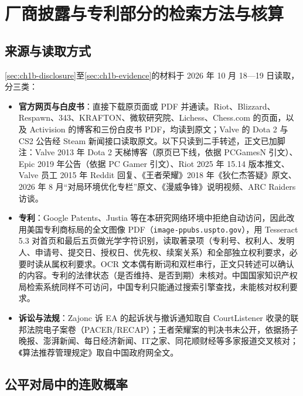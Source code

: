 \section{厂商披露与专利部分的检索方法与核算}
\label{app:ch1b}

\subsection{来源与读取方式}
\label{app:ch1b-method}

\cref{sec:ch1b-disclosure}至\cref{sec:ch1b-evidence}的材料于 2026 年 10 月 18—19 日读取，分三类：

\begin{itemize}
  \item \textbf{官方网页与白皮书}：直接下载原页面或 PDF 并通读。Riot、Blizzard、Respawn、343、KRAFTON、微软研究院、Lichess、Chess.com 的页面，以及 Activision 的博客和三份白皮书 PDF，均读到原文；Valve 的 Dota 2 与 CS2 公告经 Steam 新闻接口读取原文。以下只读到二手转述，正文已加脚注：Valve 2013 年 Dota 2 天梯博客（原页已下线，依据 PCGamesN 引文）、Epic 2019 年公告（依据 PC Gamer 引文）、Riot 2025 年 15.14 版本推文、Valve 员工 2015 年 Reddit 回复、《王者荣耀》2018 年《狄仁杰答疑》原文、2026 年 8 月“对局环境优化专栏”原文、《漫威争锋》说明视频、ARC Raiders 访谈。
  \item \textbf{专利}：Google Patents、Justia 等在本研究网络环境中拒绝自动访问，因此改用美国专利商标局的全文图像 PDF（\texttt{image-ppubs.uspto.gov}），用 Tesseract 5.3 对首页和最后五页做光学字符识别，读取著录项（专利号、权利人、发明人、申请号、提交日、授权日、优先权、续案关系）和全部独立权利要求，必要时读从属权利要求。OCR 文本偶有断词和双栏串行，正文只转述可以确认的内容。专利的法律状态（是否维持、是否到期）未核对。中国国家知识产权局检索系统同样不可访问，中国专利只能通过搜索引擎查找，未能核对权利要求。
  \item \textbf{诉讼与法规}：Zajonc 诉 EA 的起诉状与撤诉通知取自 CourtListener 收录的联邦法院电子案卷（PACER/RECAP）；王者荣耀案的判决书未公开，依据扬子晚报、澎湃新闻、每日经济新闻、IT之家、同花顺财经等多家报道交叉核对；《算法推荐管理规定》取自中国政府网全文。
\end{itemize}

\subsection{公平对局中的连败概率}
\label{app:ch1b-streak}

